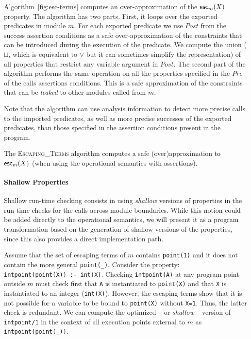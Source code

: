 \documentclass{llncs}
\begin{document}
Algorithm~\ref{fig:esc-terms} computes an
over-approximation of the $\mathsf{esc}_{m}(X)$ property. The algorithm
has two parts. First, it loops over the exported predicates in module
$m$. For each exported predicate we use $Post$ from the success
assertion conditions as a safe over-approximation of the constraints
that can be introduced during the execution of the predicate. We
compute the union ($\sqcup$, which is equivalent to $\vee$ but it can
sometimes simplify the representation) of all properties that restrict
any variable argument in $Post$.
%
The second part of the algorithm performs the same operation on all
the properties specified in the
$Pre$ of the calls assertions conditions. This is a safe approximation
of the constraints that can be \emph{leaked} to other modules called
from $m$.

Note that the algorithm
can
use analysis information to detect more precise calls to the imported
predicates, as well as more precise successes of the exported
predicates, than those specified in the assertion conditions present
in the program.

\begin{lemma}
  \label{lemma:escape-correct}
  The \textsc{Escaping\_Terms} algorithm computes a safe
  (over)approximation to $\mathsf{esc}_{m}(X)$ (when using the
  operational semantics with assertions).
\end{lemma}

\paragraph{Shallow Properties}
%
Shallow run-time checking consists in using \emph{shallow} versions of
properties in the run-time checks for the calls across module
boundaries.
%
While this notion could be added directly to the operational
semantics, we will present it as a program transformation based on the
generation of shallow versions of the properties, since this also
provides a direct implementation path.

\begin{myexample}
  Assume that the set of escaping terms of $m$ contains \texttt{point(1)} and
  it does not contain the more general \texttt{point(\_)}.
  Consider the property:\\ \texttt{intpoint(point(X))~:-~int(X)}.
  Checking %
  \texttt{intpoint(A)} at any program
  point outside $m$ must check first that \texttt{A} is instantiated
  to \texttt{point(X)} and that \texttt{X} is instantiated to an
  integer (\texttt{int(X)}). However, the escaping terms show that it
  is not possible for a variable to be bound to \texttt{point(X)}
  without \texttt{X=1}. Thus, the latter check is redundant.
  We can compute the optimized -- or \emph{shallow} --
  version of \texttt{intpoint/1} in the context of all execution
  points external to $m$ as \texttt{intpoint(point(\_))}.
\end{myexample}
\end{document}
